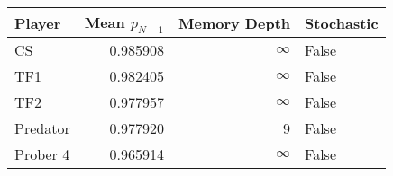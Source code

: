 \begin{tabular}{lrrl}
\toprule
   Player &  Mean $p_{N-1}$ &  Memory Depth & Stochastic \\
\midrule
       CS &        0.985908 &            \(\infty\) &      False \\
      TF1 &        0.982405 &            \(\infty\) &      False \\
      TF2 &        0.977957 &            \(\infty\) &      False \\
 Predator &        0.977920 &             9 &      False \\
 Prober 4 &        0.965914 &            \(\infty\) &      False \\
\bottomrule
\end{tabular}
